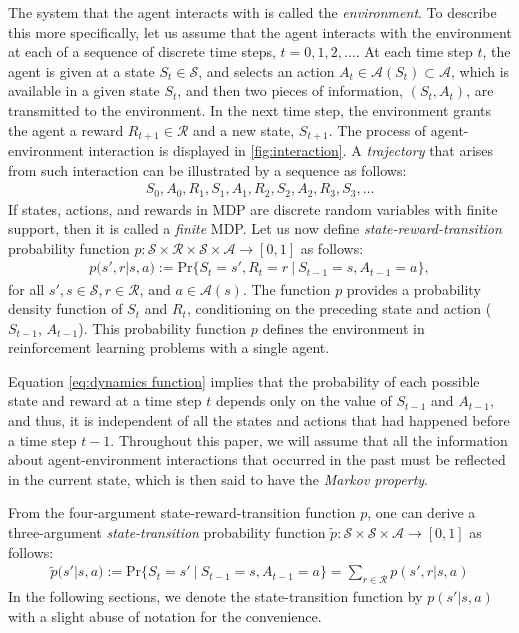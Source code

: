 The system that the agent interacts with is called the \textit{environment}. To describe this more specifically, let us assume that the agent interacts with the environment at each of a sequence of discrete time steps, $t = 0,1,2, \dots$. At each time step $t$, the agent is given at a state $S_t \in \mathcal{S}$, and selects an action $A_t \in \mathcal{A}(S_t) \subset \mathcal{A}$, which is available in a given state $S_t$, and then two pieces of information, $(S_t, A_t)$, are transmitted to the environment. In the next time step, the environment grants the agent a reward $R_{t+1} \in \mathcal{R}$ and a new state, $S_{t+1}$. The process of agent-environment interaction is displayed in \autoref{fig:interaction}. A \textit{trajectory} that arises from such interaction can be illustrated by a sequence as follows:
\begin{align}S_0, A_0, R_1, S_1, A_1, R_2, S_2, A_2, R_3, S_3, \dots\end{align}
If states, actions, and rewards in MDP are discrete random variables with finite support, then it is called a \textit{finite} MDP. Let us now define \textit{state-reward-transition} probability function $p : \mathcal{S}\times\mathcal{R}\times\mathcal{S}\times\mathcal{A}\rightarrow[0,1]$ as follows:
\begin{align}
\label{eq:dynamics function}
p(s',r|s,a) := \text{Pr}\{S_t=s', R_t=r \ | \ S_{t-1} = s, A_{t-1} = a\},
\end{align}
for all $s',s\in \mathcal{S}, r\in\mathcal{R}$, and $a\in\mathcal{A}(s)$. The function $p$ provides a probability density function of $S_t$ and $R_t$, conditioning on the preceding state and action ($S_{t-1}$, $A_{t-1}$). This probability function $p$ defines the environment in reinforcement learning problems with a single agent.

Equation \eqref{eq:dynamics function} implies that the probability of each possible state and reward at a time step $t$ depends only on the value of $S_{t-1}$ and $A_{t-1}$, and thus, it is independent of all the states and actions that had happened before a time step $t-1$. Throughout this paper, we will assume that all the information about agent-environment interactions that occurred in the past must be reflected in the current state, which is then said to have the \textit{Markov property}.

From the four-argument state-reward-transition function $p$, one can derive a three-argument \textit{state-transition} probability function $\tilde{p}:\mathcal{S}\times\mathcal{S}\times\mathcal{A}\rightarrow[0,1]$ as follows:
\begin{align}
\label{eq:state-transition function}
\tilde{p}(s'|s,a) := \text{Pr}\{S_t=s' \ | \ S_{t-1} = s, A_{t-1} = a\} = \sum_{r\in\mathcal{R}}p(s',r|s,a)
\end{align}
In the following sections, we denote the state-transition function by $p(s'|s,a)$ with a slight abuse of notation for the convenience.

